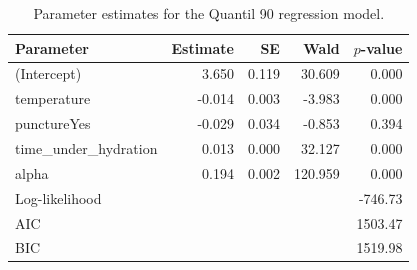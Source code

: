 \begin{table}[ht]
\centering
\caption{Parameter estimates for the Quantil 90 regression model.}
\label{tab:quantil_90}
\begin{tabular}{lrrrr}
\toprule
Parameter & Estimate & SE & Wald & $p$-value\\
\midrule
(Intercept) & 3.650 & 0.119 & 30.609 & 0.000\\
temperature & -0.014 & 0.003 & -3.983 & 0.000\\
punctureYes & -0.029 & 0.034 & -0.853 & 0.394\\
time_under_hydration & 0.013 & 0.000 & 32.127 & 0.000\\
alpha & 0.194 & 0.002 & 120.959 & 0.000\\
\midrule
Log-likelihood & \multicolumn{4}{r}{-746.73}\\
AIC & \multicolumn{4}{r}{1503.47}\\
BIC & \multicolumn{4}{r}{1519.98}\\
\bottomrule
\end{tabular}
\end{table}
